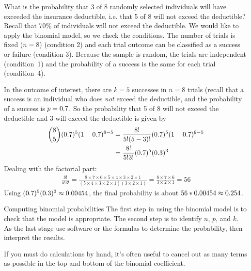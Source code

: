 \begin{examplewrap}
\begin{nexample}{What is the probability that 3 of 8 randomly
    selected individuals will have exceeded the insurance
    deductible, i.e. that 5 of 8 will not exceed the deductible?
    Recall that 70\% of individuals will not exceed the
    deductible.}
  We would like to apply the binomial model,
  so we check the conditions.
  The number of trials is fixed ($n = 8$) (condition 2)
  and each trial outcome can be classified as a success
  or failure (condition 3).
  Because the sample is random, the trials are independent
  (condition~1) and the probability of a success is the same
  for each trial (condition~4).

  In the outcome of interest, there are $k = 5$ successes
  in $n = 8$ trials (recall that a success is an individual
  who does \emph{not} exceed the deductible, and the
  probability of a success is $p = 0.7{}$.
  So the probability that 5 of 8 will not exceed the
  deductible and 3 will exceed the deductible is given by
  \begin{align*}
  { 8 \choose 5}(0.7{})^5
  (1-0.7{})^{8-5}
    &= \frac{8!}{5!(5-3)!}
        (0.7{})^5(1-0.7{})^{8-5} \\
    &= \frac{8!}{5!3!}
        (0.7{})^5(0.3{})^3
  \end{align*}
  Dealing with the factorial part:
  \begin{align*}
  \frac{8!}{5!3!}
    = \frac{8\times7\times6\times5\times4\times3\times2\times1}
        {(5\times4\times3\times2\times1)(3\times2\times1)}
    = \frac{8\times7\times6}{3\times2\times1}
    = 56
  \end{align*}
  Using $(0.7{})^5(0.3{})^3
    \approx 0.00454{}$,
  the final probability is about
  $56 * 0.00454{}
    \approx 0.254{}$.
\end{nexample}
\end{examplewrap}

\begin{onebox}{Computing binomial probabilities}
  The first step in using the binomial model is to check
  that the model is appropriate.
  The second step is to identify $n$, $p$, and $k$.
  As the last stage use software or the formulas
  to determine the probability, then interpret the results.%
  \vspace{3mm}

  If you must do calculations by hand, it's often useful
  to cancel out as many terms as possible in the top and
  bottom of the binomial coefficient.
\end{onebox}

